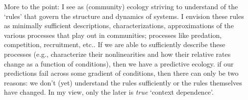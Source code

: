 \documentclass[10pt,letterpaper]{article}
\begin{document}
More to the point:  I see as (community) ecology striving to understand of the `rules' that govern the structure and dynamics of systems.  I envision these rules as minimally sufficient descriptions, characterizations, approximations of the various processes that play out in communities; processes like predation, competition, recruitment, etc..  If we are able to sufficiently describe these processes (e.g., characterize their nonlinearities and how their relative rates change as a function of conditions), then we have a predictive ecology. if our predictions fail across some gradient of conditions, then there can only be two reasons:  we don't (yet) understand the rules sufficiently or the rules themselves have changed.  In my view, only the later is \emph{true} `context dependence'.
\end{document}
